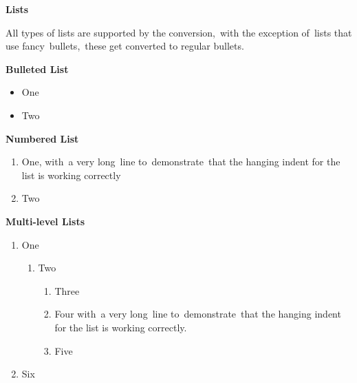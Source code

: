 \documentclass[\officeparserdriver aspectratio=169,12pt,xcolor=table]{beamer}
\begin{document}
\begin{frame}[allowframebreaks]
\relax
{\centering \textcolor{hex365F91}{\textbf{{\fontsize{14pt}{16.8pt}\selectfont Lists}}}\par}

{\leftskip=18bp\hangindent=18bp \textcolor{hex365F91}{All types of lists are supported by the conversion,~with the exception of~lists that use fancy~bullets,~these get converted to regular bullets.}\par}

{\leftskip=18bp\hangindent=18bp \textcolor{hex4F81BD}{\textbf{{\fontsize{13pt}{15.6pt}\selectfont Bulleted List}}}\par}

\begin{itemize}
\item \textcolor{hex000000}{One}
\item \textcolor{hex000000}{Two}
\end{itemize}

\textcolor{hex4F81BD}{\textbf{{\fontsize{13pt}{15.6pt}\selectfont Numbered List}}}

\begin{enumerate}
\item \textcolor{hex000000}{One, with~a very long~line to~demonstrate~that the hanging indent for the list is working correctly}
\item \textcolor{hex000000}{Two}
\end{enumerate}

\textcolor{hex4F81BD}{\textbf{{\fontsize{13pt}{15.6pt}\selectfont Multi-level Lists}}}

\begin{enumerate}
\item \textcolor{hex000000}{One}
\begin{enumerate}
\item \textcolor{hex000000}{Two}
\begin{enumerate}
\item \textcolor{hex000000}{Three}
\item \textcolor{hex000000}{Four with~a very long~line to~demonstrate~that the hanging indent for the list is working correctly.}
\item \textcolor{hex000000}{Five}
\end{enumerate}
\end{enumerate}
\item \textcolor{hex000000}{Six}
\end{enumerate}


\end{frame}
\end{document}
